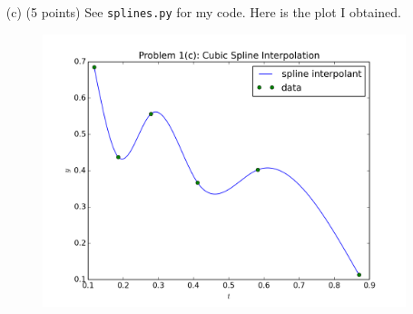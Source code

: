 \documentclass[10pt]{article}
\begin{document}
\begin{itemize}
\begin{proof}[Solution \& Proof]
For the Lagrange basis, we have \begin{align*}
\ell_0(t) &= \frac{(t - 0)(t - 1)}{(-1 - 0)(-1 - 1)} = \frac{t^2 - t}{2} \\
\ell_1(t) &= \frac{(t - (-1))(t - 1)}{(0 - (-1))(0 - 1)} = \frac{t^2 - 1}{-1} \\
\ell_2(t) &= \frac{(t - (-1))(t - 0)}{(1 - (-1))(1 - 0)} = \frac{t^2 + t}{2}
\end{align*} and the interpolating polynomial is given by $$
p(t) = 1 \cdot \ell_0(t) + 0 \cdot \ell_1(t) + 1 \cdot \ell_2(t)
= \frac{t^2 - t}{2} + \frac{t^2 + t}{2} = t^2.
$$

For the Newton basis, we have $ n_0(t) = 1, n_1(x) = t - (-1) = t+1, n_2(t) = (t+1)t = t^2 + t  $. We conclude the divided differences and obtain $$
y[-1] = y(-1) = 1, \quad y[-1,0] = \frac{0 - 1}{0 - (-1)} = -1, \quad y[-1,0,1] = \frac{y[1,0] - y[0,-1]}{1 - (-1)} = \frac{1 - (-1)}{2} = 1.
$$ Thus, Newton interpolation gives $$
p(t) = 1 \cdot 1 + (-1) \cdot (t+1) + 1 \cdot (t^2 + t) = t^2
$$

For each method, we obtain the same interpolating polynomial.
\end{proof}

\item[(c)]  (5 points) See \verb+splines.py+ for my code. Here is the plot I obtained. 

\begin{figure}[H]
  \centering
    \includegraphics[scale=0.6]{spline}
\end{figure}

\end{itemize}
\end{document}
